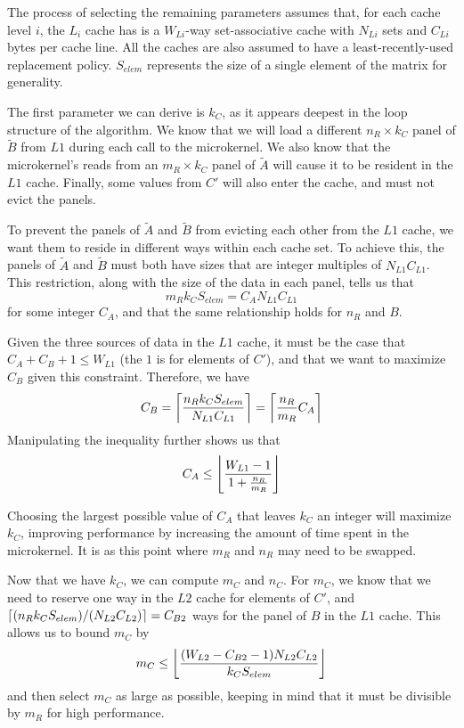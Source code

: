 \documentclass[12pt]{article}
\DeclarePairedDelimiter\ceil{\lceil}{\rceil}
\DeclarePairedDelimiter\floor{\lfloor}{\rfloor}
\begin{document}
The process of selecting the remaining parameters assumes that, for each cache level $i$, the $L_i$ cache has is a $W_{Li}$-way set-associative cache with $N_{Li}$ sets and $C_{Li}$ bytes per cache line.
All the caches are also assumed to have a least-recently-used replacement policy.
$S_{elem}$ represents the size of a single element of the matrix for generality.

The first parameter we can derive is $k_C$, as it appears deepest in the loop structure of the algorithm.
We know that we will load a different $n_R \times k_C$ panel of $\widetilde{B}$ from $L1$ during each call to the microkernel.
We also know that the microkernel's reads from an $m_R \times k_C$ panel of $\widetilde{A}$ will cause it to be resident in the $L1$ cache.
Finally, some values from $C'$ will also enter the cache, and must not evict the panels.

To prevent the panels of $\widetilde{A}$ and $\widetilde{B}$ from evicting each other from the $L1$ cache, we want them to reside in different ways within each cache set.
To achieve this, the panels of $\widetilde{A}$ and $\widetilde{B}$ must both have sizes that are integer multiples of $N_{L1}C_{L1}$.
This restriction, along with the size of the data in each panel, tells us that
\begin{equation*}
  m_Rk_CS_{elem} = C_AN_{L1}C_{L1}
\end{equation*}
for some integer $C_A$, and that the same relationship holds for $n_R$ and $B$.

Given the three sources of data in the $L1$ cache, it must be the case that $C_A + C_B + 1 \leq W_{L1}$ (the $1$ is for elements of $C'$), and that we want to maximize $C_B$ given this constraint.
Therefore, we have
\begin{equation*}
  C_B = \ceil*{\frac{n_Rk_CS_{elem}}{N_{L1}C_{L1}}} = \ceil*{\frac{n_R}{m_R}C_A}
\end{equation*}
Manipulating the inequality further shows us that
\begin{equation*}
  C_A \leq \floor*{\frac{W_{L1} - 1}{1 + \frac{n_R}{m_R}}}
\end{equation*}

Choosing the largest possible value of $C_A$ that leaves $k_C$ an integer will maximize $k_C$, improving performance by increasing the amount of time spent in the microkernel.
It is as this point where $m_R$ and $n_R$ may need to be swapped.

Now that we have $k_C$, we can compute $m_C$ and $n_C$.
For $m_C$, we know that we need to reserve one way in the $L2$ cache for elements of $C'$, and $\ceil*{(n_Rk_CS_{elem})/(N_{L2}C_{L2})} = C_{B2}$ ways for the panel of $B$ in the $L1$ cache.
This allows us to bound $m_C$ by
\begin{equation*}
  m_C \leq \floor*{\frac{(W_{L2} - C_{B2} - 1)N_{L2}C_{L2}}{k_CS_{elem}}}
\end{equation*}
and then select $m_C$ as large as possible, keeping in mind that it must be divisible by $m_R$ for high performance.
\end{document}
